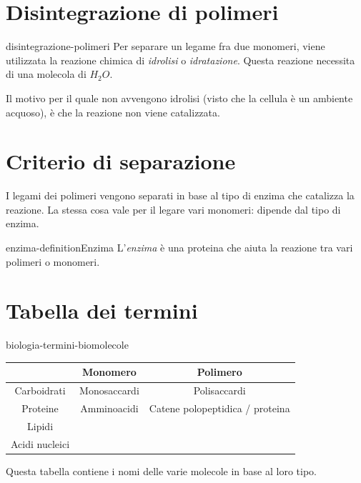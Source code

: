 \documentclass[preview]{standalone}
\begin{document}

\section{Disintegrazione di polimeri}

\begin{snippet}{disintegrazione-polimeri}
    Per separare un legame fra due monomeri, viene utilizzata la reazione chimica di \textit{idrolisi} o \textit{idratazione}.
    Questa reazione necessita di una molecola di \(H_2O\).
\end{snippet}

\begin{plainhtml}
  Il motivo per il quale non avvengono idrolisi (visto che la cellula è un ambiente acquoso),
  è che la reazione non viene catalizzata.
\end{plainhtml}

\section{Criterio di separazione}

\begin{plainhtml}
  I legami dei polimeri vengono separati in base al tipo di enzima che catalizza la reazione.
  La stessa cosa vale per il legare vari monomeri: dipende dal tipo di enzima.
\end{plainhtml}

\begin{snippetdefinition}{enzima-definition}{Enzima}
  L'\emph{enzima} è una proteina che aiuta la reazione tra vari polimeri o monomeri.
\end{snippetdefinition}

\section{Tabella dei termini}

\begin{snippet}{biologia-termini-biomolecole}
  \begin{center}

    \begin{tabular}{ |c|c|c| }
      \hline
      & Monomero & Polimero \\ 
      \hline 
      Carboidrati & Monosaccardi & Polisaccardi \\
      \hline 
      Proteine & Amminoacidi & Catene polopeptidica / proteina \\
      \hline 
      Lipidi & & \\
      \hline 
      Acidi nucleici & & \\
      \hline

    \end{tabular}
  \end{center}
  \phantom{}
\end{snippet}

\begin{plainhtml}
  Questa tabella contiene i nomi delle varie molecole in base al loro tipo.
\end{plainhtml}
\end{document}
